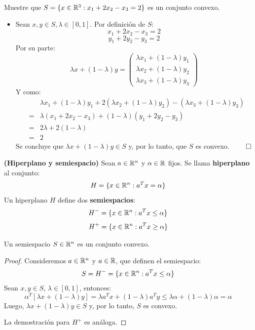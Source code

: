 \begin{ejercicio}
	Muestre que $S = \{ x \in \mathbb{R}^3 : x_1 + 2 x_2 - x_3 = 2 \}$ es un conjunto convexo.
	
	\begin{itemize}
		\item Sean $x,y \in S, \lambda \in [0,1]$. Por definición de $S$: 
		$$ x_1 + 2 x_2 - x_3 = 2 $$ 
		$$ y_1 + 2 y_2 - y_3 = 2 $$  
		Por su parte: 
		$$ \lambda x + ( 1 - \lambda ) y = \begin{pmatrix}
			\lambda x_1 +  ( 1- \lambda) y_1 \\
			\lambda x_2 +  ( 1- \lambda) y_2\\
			\lambda x_3 +  ( 1- \lambda) y_3
		\end{pmatrix} $$  
		Y como:
		\begin{eqnarray*}
			& & \lambda x_1 +  ( 1- \lambda) y_1  + 2 (	\lambda x_2 +  ( 1- \lambda) y_2) -(\lambda x_3 +  ( 1- \lambda) y_3)  \\  
			&=& \lambda (x_1 + 2 x_2 - x_3) + (1 - \lambda) (y_1 + 2 y_2 - y_3) \\  
			&=& 2 \lambda + 2( 1 - \lambda ) \\  
			&=& 2 
		\end{eqnarray*} 
		Se concluye que $\lambda x + ( 1 - \lambda ) y \in S$ y, por lo tanto, que $S$ es convexo. $\qed$ 
	\end{itemize} 
\end{ejercicio}


\begin{definicion}
	\textbf{(Hiperplano y semiespacio)}
	Sean $a \in \mathbb{R}^n$ y $\alpha \in \mathbb{R}$ fijos. Se llama \textbf{hiperplano} al conjunto: 
	$$ H = \{ x \in \mathbb{R}^n : a^T x = \alpha \} $$ 
	Un hiperplano $H$ define dos \textbf{semiespacios}: 
	$$ H^- = \{ x \in \mathbb{R}^n : a^T x \leq \alpha \} $$ 
	$$ H ^+  = \{ x \in \mathbb{R}^n : a^T x \geq \alpha \} $$ 
\end{definicion}


\begin{proposicion}
	Un semiespacio $S \in \mathbb{R}^n$ es un conjunto convexo.  
\end{proposicion} 

\begin{proof}
	Consideremos $a \in \mathbb{R}^n$ y $a \in \mathbb{R}$, que definen el semiespacio: 
	$$ S = H^- = \{ x \in \mathbb{R}^n : a^T x \leq \alpha \} $$  
	Sean $x, y \in S$, $\lambda \in [0,1]$, entonces: 
	$$ \alpha ^T [ \lambda x + ( 1 - \lambda ) y ] = \lambda a^T x + ( 1 - \lambda) a ^T y \leq \lambda \alpha + ( 1 - \lambda ) \alpha = \alpha $$  
	Luego, $\lambda x + (1 - \lambda) y \in S$ y, por lo tanto, $S$ es convexo. 
	
	La demostración para $H^+$ es análoga. 
\end{proof}

